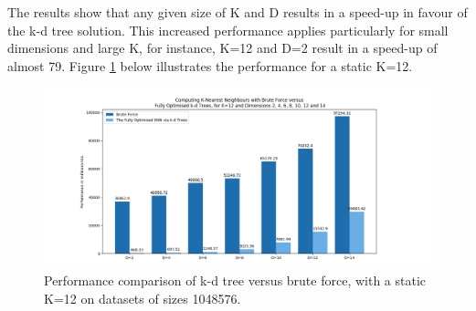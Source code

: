 
The results show that any given size of K and D results in a speed-up in favour of the k-d tree solution. This increased performance applies particularly for small dimensions and large K, for instance, K=12 and D=2 result in a speed-up of almost 79. Figure \ref{fig:b3} below illustrates the performance for a static K=12.


\begin{figure}[H]
\centering
\includegraphics[width=1.1\textwidth]{pics/plot-figs/brute-mult-k12-side.png}
\caption{Performance comparison of k-d tree versus brute force, with a static K=12 on datasets of sizes 1048576.}
\label{fig:b3}
\end{figure}










